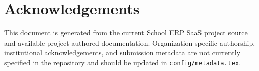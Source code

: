 \chapter*{Acknowledgements}
This document is generated from the current School ERP SaaS project source and available project-authored documentation. Organization-specific authorship, institutional acknowledgements, and submission metadata are not currently specified in the repository and should be updated in \texttt{config/metadata.tex}.
